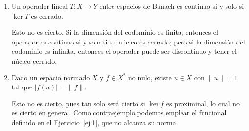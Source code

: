 \documentclass[12pt]{article}
\begin{document}
\begin{ejercicio}
\begin{enumerate}[label=(\alph*)]
        Como la dimensión del codominio es finita, entonces el operador es continuo si y solo si su núcleo es cerrado. Por tanto, si $f$ no es continuo, entonces $\ker f$ no es cerrado. Por tanto:
        \begin{equation*}
            \ker f \subsetneq \overline{\ker f}\subset X
        \end{equation*}

        Como $f\neq 0$, en particular es sobreyectivo, y por tanto $\ker f$ es un subespacio de codimensión $1$. Como $\ker f\subsetneq \overline{\ker f}$, se tiene que $\dim \overline{\ker f} > 1$, y por tanto $\dim \overline{\ker f} = \dim X$. Por tanto, $\overline{\ker f} = X$, y por tanto $\ker f$ es denso en $X$.
        \item Un operador lineal $T: X \to Y$ entre espacios de Banach es continuo si y solo si $\ker T$ es cerrado.
        
        Esto no es cierto. Si la dimensión del codominio es finita, entonces el operador es continuo si y solo si su núcleo es cerrado; pero si la dimensión del codominio es infinita, entonces el operador puede ser discontinuo y tener el núcleo cerrado.

        \item Dado un espacio normado $X$ y $f\in X^*$ no nulo, existe $u\in X$ con $\|u\|=1$ tal que $|f(u)|=\|f\|$.
        
        Esto no es cierto, pues tan solo será cierto si $\ker f$ es proximinal, lo cual no es cierto en general. Como contraejemplo podemos emplear el funcional definido en el Ejercicio~\ref{ej:1}, que no alcanza su norma.
    \end{enumerate}    
\end{ejercicio}
\end{document}
